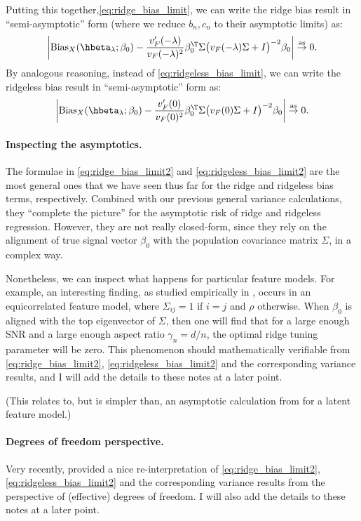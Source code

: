 \documentclass{article}
\begin{document}
Putting this together,\eqref{eq:ridge_bias_limit}, we can write the
ridge bias result in ``semi-asymptotic'' form (where we reduce $b_n,c_n$ to
their asymptotic limits) as:    
\begin{equation}
\label{eq:ridge_bias_limit2}
\bigg| \Bias_X(\hbeta_\lambda; \beta_0) - \frac{v'_F(-\lambda)}{v_F(-\lambda)^2}
\beta_0^\T \Sigma \big( v_F(-\lambda) \Sigma + I \big)^{-2} \beta_0 \bigg| \asto
0.
\end{equation}
By analogous reasoning, instead of \eqref{eq:ridgeless_bias_limit}, we can write
the ridgeless bias result in ``semi-asymptotic'' form as:
\begin{equation}
\label{eq:ridgeless_bias_limit2}
\bigg| \Bias_X(\hbeta_\lambda; \beta_0) - \frac{v'_F(0)}{v_F(0)^2} \beta_0^\T
\Sigma \big( v_F(0) \Sigma + I \big)^{-2} \beta_0 \bigg| \asto 0.
\end{equation}

\paragraph{Inspecting the asymptotics.}

The formulae in \eqref{eq:ridge_bias_limit2} and
\eqref{eq:ridgeless_bias_limit2} are the most general ones that we have seen
thus far for the ridge and ridgeless bias terms, respectively. Combined with our
previous general variance calculations, they ``complete the picture'' for the
asymptotic risk of ridge and ridgeless regression. However, they are not really
closed-form, since they rely on the alignment of true signal vector $\beta_0$  
with the population covariance matrix $\Sigma$, in a complex way.

Nonetheless, we can inspect what happens for particular feature models. For
example, an interesting finding, as studied empirically in
\citet{kobak2020optimal}, occurs in an equicorrelated feature model, where
$\Sigma_{ij} = 1$ if $i=j$ and $\rho$ otherwise. When $\beta_0$ is aligned with  
the top eigenvector of $\Sigma$, then one will find that for a large enough SNR 
and a large enough aspect ratio $\gamma_n = d/n$, the optimal ridge tuning
parameter will be zero. This phenomenon should mathematically verifiable from  
\eqref{eq:ridge_bias_limit2}, \eqref{eq:ridgeless_bias_limit2} and the
corresponding variance results, and I will add the details to these notes at a
later point.   

(This relates to, but is simpler than, an asymptotic calculation from
\citet{hastie2022surprises} for a latent feature model.) 

\paragraph{Degrees of freedom perspective.}

Very recently, \citet{bach2023high} provided a nice re-interpretation of
\eqref{eq:ridge_bias_limit2}, \eqref{eq:ridgeless_bias_limit2} and the
corresponding variance results from the perspective of (effective) degrees of
freedom. I will also add the details to these notes at a later point. 



\end{document}
